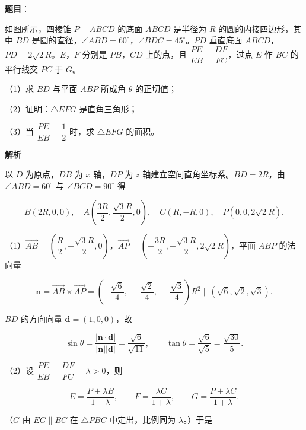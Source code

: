 \begin{answer}

\textbf{题目}：

如图所示，四棱锥 $P-ABCD$ 的底面 $ABCD$ 是半径为 $R$ 的圆的内接四边形，其中 $BD$ 是圆的直径，$\angle ABD=60^\circ$，$\angle BDC=45^\circ$。$PD$ 垂直底面 $ABCD$，$PD=2\sqrt2R$。$E$，$F$ 分别是 $PB$，$CD$ 上的点，且 $\dfrac{PE}{EB}=\dfrac{DF}{FC}$，过点 $E$ 作 $BC$ 的平行线交 $PC$ 于 $G$。

（1）求 $BD$ 与平面 $ABP$ 所成角 $\theta$ 的正切值；

（2）证明：$\triangle EFG$ 是直角三角形；

（3）当 $\dfrac{PE}{EB}=\dfrac12$ 时，求 $\triangle EFG$ 的面积。
\nopagebreak[4]
\begin{center}\end{center}
\nopagebreak[4]
\textbf{解析}

以 $D$ 为原点，$DB$ 为 $x$ 轴，$DP$ 为 $z$ 轴建立空间直角坐标系。$BD=2R$，由 $\angle ABD=60^\circ$ 与 $\angle BCD=90^\circ$ 得

\nopagebreak[4]
\[B(2R,0,0),\quad A\left(\frac{3R}2,\frac{\sqrt3R}2,0\right),\quad C(R,-R,0),\quad P(0,0,2\sqrt2R).\]

（1）$\overrightarrow{AB}=\left(\dfrac R2,-\dfrac{\sqrt3R}2,0\right)$，$\overrightarrow{AP}=\left(-\dfrac{3R}2,-\dfrac{\sqrt3R}2,2\sqrt2R\right)$，平面 $ABP$ 的法向量

\nopagebreak[4]
\[\boldsymbol n=\overrightarrow{AB}\times\overrightarrow{AP}=\left(-\frac{\sqrt6}4,\ -\frac{\sqrt2}4,\ -\frac{\sqrt3}4\right)R^2\parallel\left(\sqrt6,\sqrt2,\sqrt3\right).\]

$BD$ 的方向向量 $\boldsymbol d=(1,0,0)$，故

\nopagebreak[4]
\[\sin\theta=\frac{\left|\boldsymbol n\cdot\boldsymbol d\right|}{\left|\boldsymbol n\right|\left|\boldsymbol d\right|}=\frac{\sqrt6}{\sqrt{11}},\qquad \tan\theta=\frac{\sqrt6}{\sqrt5}=\frac{\sqrt{30}}5.\]

（2）设 $\dfrac{PE}{EB}=\dfrac{DF}{FC}=\lambda>0$，则

\nopagebreak[4]
\[E=\frac{P+\lambda B}{1+\lambda},\qquad F=\frac{\lambda C}{1+\lambda},\qquad G=\frac{P+\lambda C}{1+\lambda}.\]

（$G$ 由 $EG\parallel BC$ 在 $\triangle PBC$ 中定出，比例同为 $\lambda$。）于是


\end{answer}
